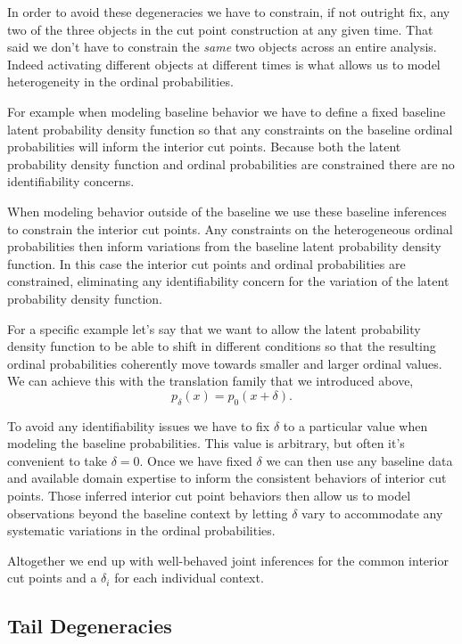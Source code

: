 \documentclass[
  letterpaper,
  DIV=11,
  numbers=noendperiod]{scrartcl}
\begin{document}
In order to avoid these degeneracies we have to constrain, if not
outright fix, any two of the three objects in the cut point construction
at any given time. That said we don't have to constrain the \emph{same}
two objects across an entire analysis. Indeed activating different
objects at different times is what allows us to model heterogeneity in
the ordinal probabilities.

For example when modeling baseline behavior we have to define a fixed
baseline latent probability density function so that any constraints on
the baseline ordinal probabilities will inform the interior cut points.
Because both the latent probability density function and ordinal
probabilities are constrained there are no identifiability concerns.

When modeling behavior outside of the baseline we use these baseline
inferences to constrain the interior cut points. Any constraints on the
heterogeneous ordinal probabilities then inform variations from the
baseline latent probability density function. In this case the interior
cut points and ordinal probabilities are constrained, eliminating any
identifiability concern for the variation of the latent probability
density function.

For a specific example let's say that we want to allow the latent
probability density function to be able to shift in different conditions
so that the resulting ordinal probabilities coherently move towards
smaller and larger ordinal values. We can achieve this with the
translation family that we introduced above, \[
p_{\delta}(x) = p_{0}(x + \delta).
\]

To avoid any identifiability issues we have to fix \(\delta\) to a
particular value when modeling the baseline probabilities. This value is
arbitrary, but often it's convenient to take \(\delta = 0\). Once we
have fixed \(\delta\) we can then use any baseline data and available
domain expertise to inform the consistent behaviors of interior cut
points. Those inferred interior cut point behaviors then allow us to
model observations beyond the baseline context by letting \(\delta\)
vary to accommodate any systematic variations in the ordinal
probabilities.

Altogether we end up with well-behaved joint inferences for the common
interior cut points and a \(\delta_{i}\) for each individual context.

\subsection{Tail Degeneracies}\label{tail-degeneracies}
\end{document}
